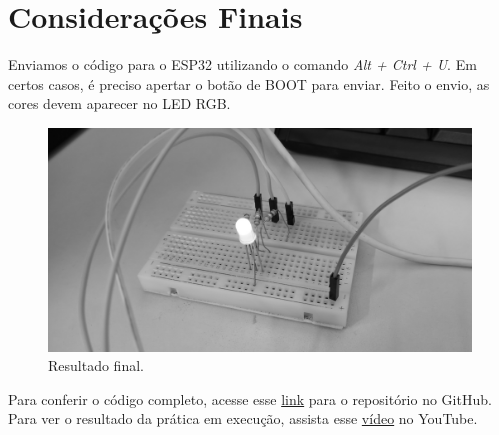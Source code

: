 \section{Considerações Finais}

Enviamos o código para o ESP32 utilizando o comando \textit{Alt + Ctrl + U}. Em certos casos, é preciso apertar o botão de BOOT para enviar. Feito o envio, as cores devem aparecer no LED RGB.

\begin{figure}
    \centering
    \includegraphics[width=0.5\linewidth]{img/final_result.jpg}
    \caption{Resultado final.}
    \label{fig:final-result}
\end{figure}

Para conferir o código completo, acesse esse \href{https://github.com/fabricio-araujo94/microcontroladores/tree/main/pwm_}{link} para o repositório no GitHub. Para ver o resultado da prática em execução, assista esse \href{https://youtu.be/cyvFmMO40j8}{vídeo} no YouTube.